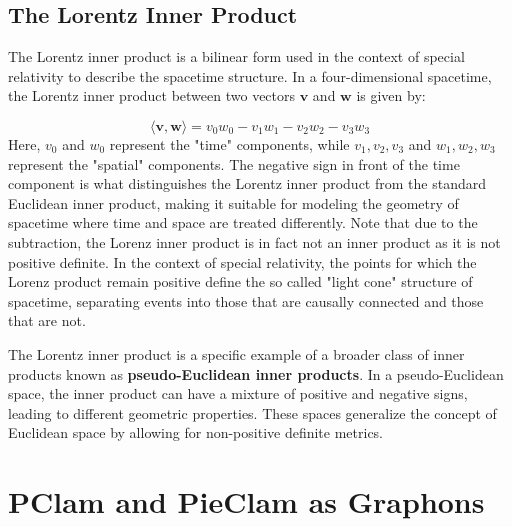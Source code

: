 \documentclass[letterpaper]{article} %
\begin{document}
\subsection{The Lorentz Inner Product}
\label{The Lorentz Inner Product}

The Lorentz inner product is a bilinear form used in the context of special relativity to describe the spacetime structure. In a four-dimensional spacetime, the Lorentz inner product between two vectors \(\mathbf{v}\) and \(\mathbf{w}\) is given by:

\[
\langle \mathbf{v}, \mathbf{w} \rangle = v_0w_0 - v_1w_1 - v_2w_2 - v_3w_3
\]
Here, \(v_0\) and \(w_0\) represent the "time" components, while \(v_1, v_2, v_3\) and \(w_1, w_2, w_3\) represent the "spatial" components. The negative sign in front of the time component is what distinguishes the Lorentz inner product from the standard Euclidean inner product, making it suitable for modeling the geometry of spacetime where time and space are treated differently. Note that due to the subtraction, the Lorenz inner product is in fact not an inner product as it is not positive definite. In the context of special relativity, the points for which the Lorenz product remain positive define the so called "light cone" structure of spacetime, separating events into those that are causally connected and those that are not. 

The Lorentz inner product is a specific example of a broader class of inner products known as \textbf{pseudo-Euclidean inner products}. In a pseudo-Euclidean space, the inner product can have a mixture of positive and negative signs, leading to different geometric properties. These spaces generalize the concept of Euclidean space by allowing for non-positive definite metrics.

\section{PClam and PieClam as Graphons}
\end{document}
